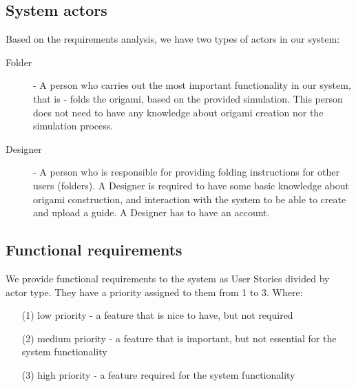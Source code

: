 \subsection{System actors}

Based on the requirements analysis, we have  two types of actors in our system:

\begin{description}
	\item[Folder] \label{actors:folder} - A person who carries out the most important functionality in our system,
		that is - folds the origami, based on the provided simulation. This person does not need to have any
		knowledge about origami creation nor the simulation process.
	\item[Designer] \label{actors:designer} - A person who is responsible for providing folding instructions
		for other users (folders). A Designer is required to have some basic knowledge about origami construction, 
		and interaction with the system to be able to create and upload a guide. A Designer has to have an account.
\end{description}

\newcommand{\requirement}[2]{\item #2. (#1)}
\subsection{Functional requirements}
\label{section:functional-requirements}

We provide functional requirements to the system as User Stories divided by actor type.
They have a priority assigned to them from 1 to 3. Where:

\begin{enumerate}
	\item[(1)] low priority - a feature that is nice to have, but not required 
	\item[(2)] medium priority - a feature that is important, but not essential for the system functionality
	\item[(3)] high priority - a feature required for the system functionality 
\end{enumerate}

